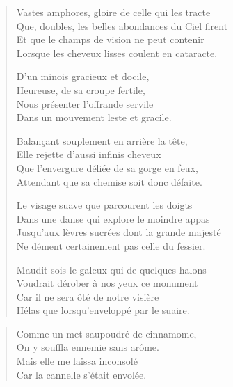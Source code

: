 \begin{verse}
Vastes amphores, gloire de celle qui les tracte\\
Que, doubles, les belles abondances du Ciel firent\\
Et que le champs de vision ne peut contenir\\
Lorsque les cheveux lisses coulent en cataracte.

D’un minois gracieux et docile,\\
Heureuse, de sa croupe fertile,\\
Nous présenter l’offrande servile\\
Dans un mouvement leste et gracile.

Balançant souplement en arrière la tête,\\
Elle rejette d’aussi infinis cheveux\\
Que l’envergure déliée de sa gorge en feux,\\
Attendant que sa chemise soit donc défaite.

Le visage suave que parcourent les doigts\\
Dans une danse qui explore le moindre appas\\
Jusqu’aux lèvres sucrées dont la grande majesté\\
Ne dément certainement pas celle du fessier.

Maudit sois le galeux qui de quelques halons\\
Voudrait dérober à nos yeux ce monument\\
Car il ne sera ôté de notre visière\\
Hélas que  lorsqu’enveloppé par le suaire.
\end{verse}

\begin{verse}
Comme un met saupoudré de cinnamome,\\
On y souffla ennemie sans arôme.\\
Mais elle me laissa inconsolé\\
Car la cannelle s’était envolée.
\end{verse}

